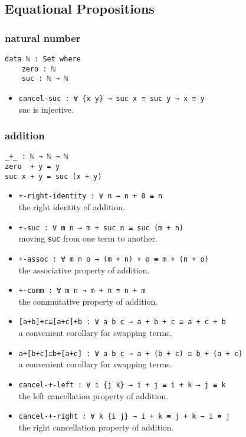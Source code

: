 \documentclass[../thesis.tex]{subfiles}
\begin{document}
\subsection{Equational Propositions}

\subsubsection{natural number}

\begin{lstlisting}
data ℕ : Set where
    zero : ℕ
    suc : ℕ → ℕ
\end{lstlisting}

\begin{itemize}
    \item {\lstinline|cancel-suc : ∀ {x y} → suc x ≡ suc y → x ≡ y|}
        \\ suc is injective.
\end{itemize}

\subsubsection{addition}

\begin{lstlisting}
_+_ : ℕ → ℕ → ℕ
zero  + y = y
suc x + y = suc (x + y)
\end{lstlisting}

\begin{itemize}
    \item {\lstinline|+-right-identity : ∀ n → n + 0 ≡ n|}
        \\ the right identity of addition.
    \item {\lstinline|+-suc : ∀ m n → m + suc n ≡ suc (m + n)|}
        \\ moving {\lstinline|suc|} from one term to another.
    \item {\lstinline|+-assoc : ∀ m n o → (m + n) + o ≡ m + (n + o)|}
        \\ the associative property of addition.
    \item {\lstinline|+-comm : ∀ m n → m + n ≡ n + m|}
        \\ the commutative property of addition.
    \item {\lstinline|[a+b]+c≡[a+c]+b : ∀ a b c → a + b + c ≡ a + c + b|}
        \\ a convenient corollary for swapping terms.
    \item {\lstinline|a+[b+c]≡b+[a+c] : ∀ a b c → a + (b + c) ≡ b + (a + c)|}
        \\ a convenient corollary for swapping terms.
    \item {\lstinline|cancel-+-left : ∀ i {j k} → i + j ≡ i + k → j ≡ k|}
        \\ the left cancellation property of addition.
    \item {\lstinline|cancel-+-right : ∀ k {i j} → i + k ≡ j + k → i ≡ j|}
        \\ the right cancellation property of addition.
\end{itemize}
\end{document}
